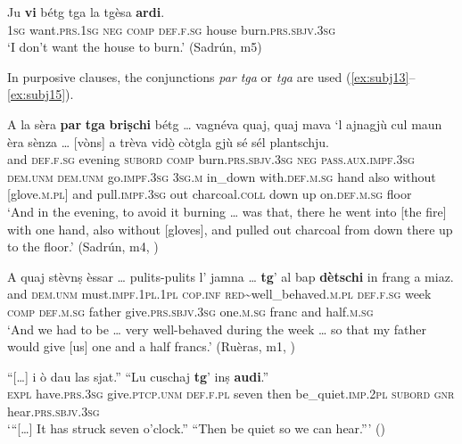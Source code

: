 \ea
\label{ex:subj12}
\gll Ju \textbf{vi} bétg tga la tgèsa \textbf{ardi}.\\
\textsc{1sg} want.\textsc{prs.1sg} \textsc{neg} \textsc{comp} \textsc{def.f.sg} house burn.\textsc{prs.sbjv.3sg}\\
\glt `I don't want the house to burn.' (Sadrún, m5)
\z

In purposive clauses, the conjunctions \textit{par tga} or \textit{tga} are used (\ref{ex:subj13}--\ref{ex:subj15}).

\ea
\label{ex:subj13}
\gll  A la sèra \textbf{par} \textbf{tga} \textbf{briṣchi} bétg … vagnéva quaj, quaj mava `l ajnagjù cul maun èra sènza … [vòns] a trèva vidò̱ còtgla gjù sé sél plantschju.\\
and \textsc{def.f.sg} evening \textsc{subord} \textsc{comp} burn.\textsc{prs.sbjv.3sg} \textsc{neg} {} \textsc{pass.aux.impf.3sg} \textsc{dem.unm} \textsc{dem.unm} go.\textsc{impf.3sg} \textsc{3sg.m} in\_down with.\textsc{def.m.sg} hand also without {} [glove.\textsc{m.pl}] and pull.\textsc{impf.3sg} out charcoal.\textsc{coll} down up on.\textsc{def.m.sg} floor  \\
\glt `And in the evening, to avoid it burning … was that, there he went into [the fire] with one hand, also without [gloves], and pulled out charcoal from down there up to the floor.' (Sadrún, m4, )
\z

\ea
\label{ex:subj14}
	\gll    A quaj stèvnṣ èssar … pulits-pulits l’ jamna … {\longrule} \textbf{tg}’ al bap \textbf{dètschi} in frang a miaz.\\
	and \textsc{dem.unm} must.\textsc{impf.1pl.1pl} \textsc{cop.inf} {} \textsc{red}\textasciitilde{well\_behaved}.\textsc{m.pl} \textsc{def.f.sg} week {} {}  \textsc{comp} \textsc{def.m.sg} father  give.\textsc{prs.sbjv.3sg} one.\textsc{m.sg} franc and half.\textsc{m.sg}\\
\glt `And we had to be … very well-behaved during the week … so that my father would give [us] one and a half francs.' (Ruèras, m1, )
\z

\ea
\label{ex:subj15}
\gll  “[…] i ò dau las sjat.” “Lu cuschaj {\longrule} \textbf{tg}’ inṣ  \textbf{audi}.”\\
     {} \textsc{expl} have.\textsc{prs.3sg} give.\textsc{ptcp.unm} \textsc{def.f.pl} seven then be\_quiet.\textsc{imp.2pl} {}  \textsc{subord} \textsc{gnr} hear.\textsc{prs.sbjv.3sg}\\
\glt `“[…] It has struck seven o’clock.” “Then be quiet so we can hear.”' (\citealt[87]{Gadola1935})
\z

